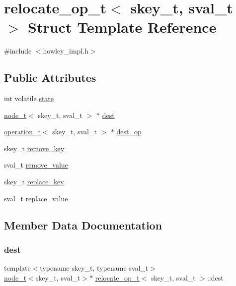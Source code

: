 \hypertarget{structrelocate__op__t}{}\section{relocate\+\_\+op\+\_\+t$<$ skey\+\_\+t, sval\+\_\+t $>$ Struct Template Reference}
\label{structrelocate__op__t}


{\ttfamily \#include $<$howley\+\_\+impl.\+h$>$}

\subsection*{Public Attributes}
\begin{DoxyCompactItemize}
\item 
int volatile \hyperlink{structrelocate__op__t_ab80ba78746bcd22f3cad9362d90694b5}{state}
\item 
\hyperlink{structnode__t}{node\+\_\+t}$<$ skey\+\_\+t, sval\+\_\+t $>$ $\ast$ \hyperlink{structrelocate__op__t_a201f7488d1fffdd2d83bf165a4488223}{dest}
\item 
\hyperlink{unionoperation__t}{operation\+\_\+t}$<$ skey\+\_\+t, sval\+\_\+t $>$ $\ast$ \hyperlink{structrelocate__op__t_aaa49b7ec6671c4a020ba85baf04e3e2d}{dest\+\_\+op}
\item 
skey\+\_\+t \hyperlink{structrelocate__op__t_aab1190c7353ccc655a185a895aa5ba8c}{remove\+\_\+key}
\item 
sval\+\_\+t \hyperlink{structrelocate__op__t_a3d0396b04b38ee8e24b84363bc5c102a}{remove\+\_\+value}
\item 
skey\+\_\+t \hyperlink{structrelocate__op__t_a38ee7e41340392298704a1f83d5f1894}{replace\+\_\+key}
\item 
sval\+\_\+t \hyperlink{structrelocate__op__t_a21914d54d59383b2809d373991ddd758}{replace\+\_\+value}
\end{DoxyCompactItemize}


\subsection{Member Data Documentation}
\mbox{\label{structrelocate__op__t_a201f7488d1fffdd2d83bf165a4488223}} 
\subsubsection{\texorpdfstring{dest}{dest}}
{\footnotesize\ttfamily template$<$typename skey\+\_\+t, typename sval\+\_\+t$>$ \\
\hyperlink{structnode__t}{node\+\_\+t}$<$skey\+\_\+t, sval\+\_\+t$>$$\ast$ \hyperlink{structrelocate__op__t}{relocate\+\_\+op\+\_\+t}$<$ skey\+\_\+t, sval\+\_\+t $>$\+::dest}

